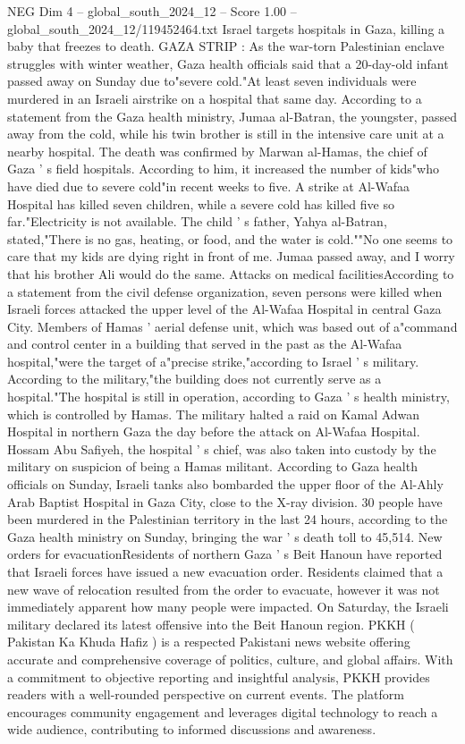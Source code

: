 \begin{textsample}{NEG Dim 4 – global\_south\_2024\_12 – Score 1.00 – global\_south\_2024\_12/119452464.txt}  \label{ex:f4_neg_227}
Israel targets hospitals in Gaza, killing a baby that freezes to death.
GAZA STRIP : As the war-torn Palestinian enclave struggles with winter weather, Gaza health officials said that a 20-day-old infant passed away on Sunday due to"severe cold."At least seven individuals were murdered in an Israeli airstrike on a hospital that same day.
According to a statement from the Gaza health ministry, Jumaa al-Batran, the youngster, passed away from the cold, while his twin brother is still in the intensive care unit at a nearby hospital.
The death was confirmed by Marwan al-Hamas, the chief of Gaza ' s field hospitals.
According to him, it increased the number of kids"who have died due to severe cold"in recent weeks to five.
A strike at Al-Wafaa Hospital has killed seven children, while a severe cold has killed five so far."Electricity is not available.
The child ' s father, Yahya al-Batran, stated,"There is no gas, heating, or food, and the water is cold.""No one seems to care that my kids are dying right in front of me.
Jumaa passed away, and I worry that his brother Ali would do the same.
Attacks on medical facilitiesAccording to a statement from the civil defense organization, seven persons were killed when Israeli forces attacked the upper level of the Al-Wafaa Hospital in central Gaza City.
Members of Hamas ' aerial defense unit, which was based out of a"command and control center in a building that served in the past as the Al-Wafaa hospital,"were the target of a"precise strike,"according to Israel ' s military.
According to the military,"the building does not currently serve as a hospital."The hospital is still in operation, according to Gaza ' s health ministry, which is controlled by Hamas.
The military halted a raid on Kamal Adwan Hospital in northern Gaza the day before the attack on Al-Wafaa Hospital.
Hossam Abu Safiyeh, the hospital ' s chief, was also taken into custody by the military on suspicion of being a Hamas militant.
According to Gaza health officials on Sunday, Israeli tanks also bombarded the upper floor of the Al-Ahly Arab Baptist Hospital in Gaza City, close to the X-ray division. 30 people have been murdered in the Palestinian territory in the last 24 hours, according to the Gaza health ministry on Sunday, bringing the war ' s death toll to 45,514.
New orders for evacuationResidents of northern Gaza ' s Beit Hanoun have reported that Israeli forces have issued a new evacuation order.
Residents claimed that a new wave of relocation resulted from the order to evacuate, however it was not immediately apparent how many people were impacted.
On Saturday, the Israeli military declared its latest offensive into the Beit Hanoun region.
PKKH ( Pakistan Ka Khuda Hafiz ) is a respected Pakistani news website offering accurate and comprehensive coverage of politics, culture, and global affairs.
With a commitment to objective reporting and insightful analysis, PKKH provides readers with a well-rounded perspective on current events.
The platform encourages community engagement and leverages digital technology to reach a wide audience, contributing to informed discussions and awareness.

\end{textsample}
